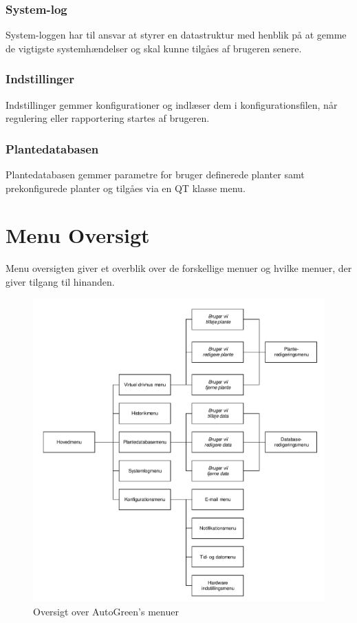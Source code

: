 \subsubsection{System-log}

System-loggen har til ansvar at styrer en datastruktur med henblik på at gemme de vigtigste systemhændelser og skal kunne tilgåes af brugeren senere.

\subsubsection{Indstillinger}

Indstillinger gemmer konfigurationer og indlæser dem i konfigurationsfilen, når regulering eller rapportering startes af brugeren. 


\subsubsection{Plantedatabasen}

Plantedatabasen gemmer parametre for bruger definerede planter samt  prekonfigurede planter og tilgåes via en QT klasse menu.

\clearpage

\section{Menu Oversigt}

Menu oversigten giver et overblik over de forskellige menuer og hvilke menuer, der giver tilgang til hinanden.

\begin{figure}[!h]
\centering 
\includegraphics[scale=0.7] {../fig/menu_oversigt.pdf}
\caption{Oversigt over AutoGreen's menuer}
\label{fig:QTMenu}
\end{figure}

